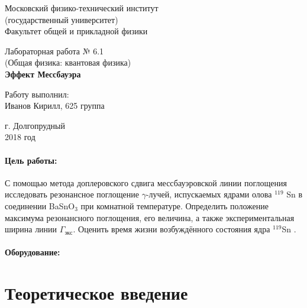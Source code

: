 \documentclass[12pt]{kiarticle}
\begin{document}
	
	\begin{titlepage}
	\begin{center}
		\large 	Московский физико-технический институт \\
		(государственный университет) \\
		Факультет общей и прикладной физики \\
		\vspace{0.2cm}
		
		\vspace{4.5cm}
		Лабораторная работа № 6.1 \\ \vspace{0.2cm}
		\large (Общая физика: квантовая физика) \\ \vspace{0.2cm}
		\LARGE \textbf{Эффект Мессбауэра}
	\end{center}
	\vspace{2.3cm} \large
	
	\begin{center}
		Работу выполнил: \\
		Иванов Кирилл,
		625 группа
		\vspace{10mm}		
		
	\end{center}
	
	\begin{center} \vspace{60mm}
		г. Долгопрудный \\
		2018 год
	\end{center}
\end{titlepage}
	
	\paragraph*{Цель работы:} С помощью метода доплеровского сдвига мессбауэровской линии поглощения исследовать резонансное поглощение $ \gamma $-лучей, испускаемых
	ядрами олова $ ^{119} $ Sn в соединении BaSnO$_3$ при комнатной температуре.
	Определить положение максимума резонансного поглощения, его величина, а также экспериментальная ширина линии $ \Gamma_{экс}$. Оценить время жизни возбуждённого состояния ядра  $^{119}$Sn .
	
	\paragraph*{Оборудование:} 
	
	\section{Теоретическое введение} 
	
\end{document}
